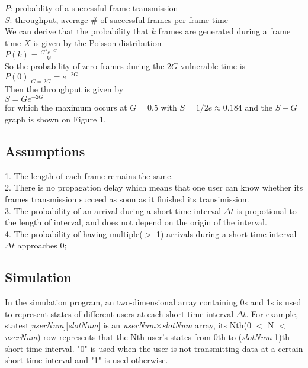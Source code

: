 \documentclass[11pt,oneside,a4paper]{report}
\begin{document}
\qquad	\(P\): probablity of a successful frame transmission \\

\qquad	\(S\): throughput, average \# of successful frames per frame time \\

We can derive that the probability that \(k\) frames are generated during a frame time \(X\) is given by the Poisson distribution \\

\qquad	\(P(k) = \frac{G^ke^{-G}}{k!}\) \\

So the probability of zero frames during the \(2G\) vulnerable time is \\

\qquad \(P(0)|_{G=2G} = e^{-2G}\) \\

Then the throughput is given by \\

\qquad \(S = Ge^{-2G}\) \\

for which the maximum occurs at \(G = 0.5\) with \(S = 1/2e \approx 0.184\) and the \(S - G\) graph is shown on Figure 1.


\subsection*{Assumptions}

1. The length of each frame remains the same. \\
2. There is no propagation delay which means that one user can know whether its frames transmission succeed as soon as it finished its transimission. \\
3. The probability of an arrival during a short time interval \(\Delta t\) is propotional to the length of interval, and does not depend on the origin of the interval. \\
4. The probability of having multiple(\(>\) 1) arrivals during a short time interval \(\Delta t\) approaches 0;

\subsection*{Simulation}

In the simulation program, an two-dimensional array containing 0s and 1s is used to represent states of different users at each short time interval \(\Delta t\). For example, statest[\emph{userNum}][\emph{slotNum}] is an \emph{userNum}\(\times\)\emph{slotNum} array, its Nth(0 \(<\) N \(<\) \emph{userNum}) row represents that the Nth user's states from 0th to (\emph{slotNum}-1)th short time interval. "0" is used when the user is not transmitting data at a certain short time interval and "1" is used otherwise. \\
\end{document}
